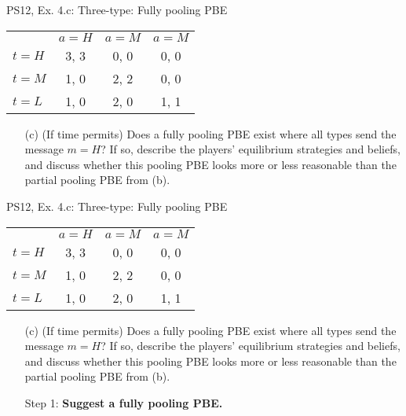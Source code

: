 \begin{frame}{PS12, Ex. 4.c: Three-type: Fully pooling PBE}
    \begin{table}
      \begin{tabular}{l|c|c|c|}
          \multicolumn{1}{c}{} & \multicolumn{1}{c}{$a=H$} & \multicolumn{1}{c}{$a=M$} & \multicolumn{1}{c}{$a=M$} \\\cline{2-4}
          $t=H$ & 3, 3 & 0, 0 & 0, 0 \\\cline{2-4}
          $t=M$ & 1, 0 & 2, 2 & 0, 0 \\\cline{2-4}
          $t=L$ & 1, 0 & 2, 0 & 1, 1 \\\cline{2-4}
      \end{tabular}
    \end{table}\vspace{-8pt}
    \begin{itemize}
      \item[(c)] (If time permits) Does a fully pooling PBE exist where all types send the message $m = H$? If so, describe the players’ equilibrium strategies and beliefs, and discuss whether this pooling PBE looks more or less reasonable than the partial pooling PBE from (b).
    \end{itemize}
    \vfill\null
\end{frame}
\begin{frame}{PS12, Ex. 4.c: Three-type: Fully pooling PBE}
    \begin{table}
      \begin{tabular}{l|c|c|c|}
          \multicolumn{1}{c}{} & \multicolumn{1}{c}{$a=H$} & \multicolumn{1}{c}{$a=M$} & \multicolumn{1}{c}{$a=M$} \\\cline{2-4}
          $t=H$ & 3, 3 & 0, 0 & 0, 0 \\\cline{2-4}
          $t=M$ & 1, 0 & 2, 2 & 0, 0 \\\cline{2-4}
          $t=L$ & 1, 0 & 2, 0 & 1, 1 \\\cline{2-4}
      \end{tabular}
    \end{table}\vspace{-8pt}
    \begin{itemize}
      \item[(c)] (If time permits) Does a fully pooling PBE exist where all types send the message $m = H$? If so, describe the players’ equilibrium strategies and beliefs, and discuss whether this pooling PBE looks more or less reasonable than the partial pooling PBE from (b).
      \item[Step 1:] \textbf{Suggest a fully pooling PBE.}
    \end{itemize}
    \vfill\null
\end{frame}
